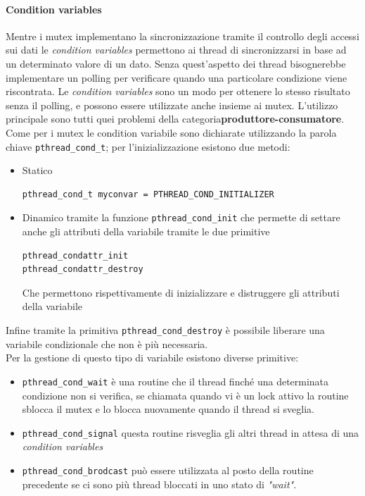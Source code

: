 \paragraph{Condition variables}
Mentre i mutex implementano la sincronizzazione tramite il controllo degli accessi sui dati le \emph{condition variables} permettono ai thread di sincronizzarsi in base ad un determinato valore di un dato. Senza quest'aspetto dei thread bisognerebbe implementare un polling per verificare quando una particolare condizione viene riscontrata. Le \emph{condition variables} sono un modo per ottenere lo stesso risultato senza il polling, e possono essere utilizzate anche insieme ai mutex.
L'utilizzo principale sono tutti quei problemi della categoria\textbf{produttore-consumatore}.\\
Come per i mutex le condition variabile sono dichiarate utilizzando la parola chiave \texttt{pthread\_cond\_t}; per l'inizializzazione esistono due metodi:
\begin{itemize}
\item Statico
\begin{verbatim}
pthread_cond_t myconvar = PTHREAD_COND_INITIALIZER
\end{verbatim}
\item Dinamico tramite la funzione \texttt{pthread\_cond\_init} che permette di settare anche gli attributi della variabile tramite le due primitive
\begin{verbatim}
pthread_condattr_init
pthread_condattr_destroy
\end{verbatim}
Che permettono rispettivamente di inizializzare e distruggere gli attributi della variabile
\end{itemize}
Infine tramite la primitiva \texttt{pthread\_cond\_destroy} è possibile liberare una variabile condizionale che non è più necessaria.\\
Per la gestione di questo tipo di variabile esistono diverse primitive:
\begin{itemize}
\item \texttt{pthread\_cond\_wait} è una routine che il thread finché una determinata condizione non si verifica, se chiamata quando vi è un lock attivo la routine sblocca il mutex e lo blocca nuovamente quando il thread si sveglia.
\item \texttt{pthread\_cond\_signal} questa routine risveglia gli altri thread in attesa di una \emph{condition variables}
\item \texttt{pthread\_cond\_brodcast} può essere utilizzata al posto della routine precedente se ci sono più thread bloccati in uno stato di \emph{"wait"}.
\end{itemize}

